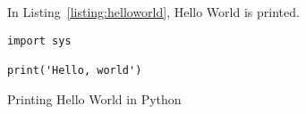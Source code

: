 In Listing~\ref{listing:helloworld}, Hello World is printed.

\begin{listing}
\begin{verbatim}
import sys

print('Hello, world')
\end{verbatim}
\caption{Printing Hello World in Python}
\label{listing:helloworld}
\end{listing}
  
  
  
